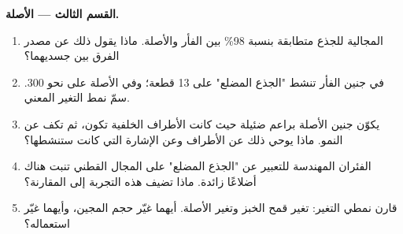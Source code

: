 \begin{problem}
\medskip
\noindent\textbf{القسم الثالث ---  الأصلة.}
\begin{enumerate}[resume]
  \item {} المجالية للجذع متطابقة بنسبة 98\% بين الفأر والأصلة.
        ماذا يقول ذلك عن مصدر الفرق بين جسديهما؟
  \item في جنين الفأر تنشط  "الجذع المضلع" على 13 قطعة؛ وفي
        الأصلة على نحو 300. سمّ نمط التغير المعني.
  \item يكوّن جنين الأصلة براعم ضئيلة حيث كانت الأطراف الخلفية تكون،
        ثم تكف عن النمو. ماذا يوحي ذلك عن  الأطراف وعن الإشارة
        التي كانت ستنشطها؟
  \item الفئران المهندسة للتعبير عن  "الجذع المضلع" على المجال
        القطني تنبت هناك أضلاعًا زائدة. ماذا تضيف هذه التجربة إلى
        المقارنة؟
  \item قارن نمطي التغير: تغير قمح الخبز وتغير الأصلة. أيهما غيّر حجم
        المجين، وأيهما غيّر استعماله؟
\end{enumerate}


\end{problem}
